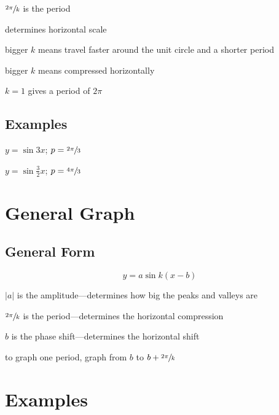 \documentclass{exam}
\begin{document}
  \begin{itemize*}
    \item $\sfrac{2 \pi}{k}$ is the period
    \item determines horizontal scale
    \item bigger $k$ means travel faster around the unit circle and a shorter period
    \item bigger $k$ means compressed horizontally
    \item $k = 1$ gives a period of $2 \pi$
  \end{itemize*}

  \subsection{Examples}
  \begin{enumerate*}
    \item $y = \sin 3x$; $p = \sfrac{2 \pi}{3}$
    \item $y = \sin \frac{3}{2} x$; $p = \sfrac{4 \pi}{3}$
  \end{enumerate*}

  \section{General Graph}
  \subsection{General Form}
  \[
    y = a \sin k(x - b)
  \]

  \begin{itemize*}
    \item $|a|$ is the amplitude---determines how big the peaks and valleys are
    \item $\sfrac{2 \pi}{k}$ is the period---determines the horizontal compression
    \item $b$ is the phase shift---determines the horizontal shift
    \item to graph one period, graph from $b$ to $b + \sfrac{2 \pi}{k}$
  \end{itemize*}

  \section{Examples}
\end{document}
